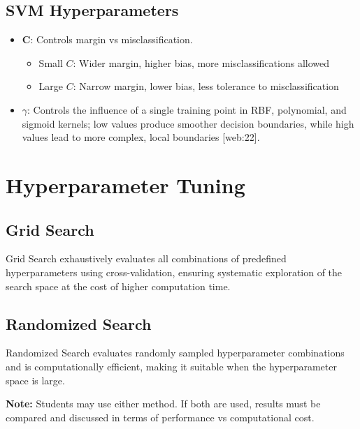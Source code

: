 \documentclass[11pt]{article}
\begin{document}
\subsection*{SVM Hyperparameters}
\begin{itemize}
\item \textbf{C}: Controls margin vs misclassification.
\begin{itemize}
\item Small $C$: Wider margin, higher bias, more misclassifications allowed
\item Large $C$: Narrow margin, lower bias, less tolerance to misclassification
\end{itemize}
\item \textbf{$\gamma$}: Controls the influence of a single training point in RBF, polynomial, and sigmoid kernels; low values produce smoother decision boundaries, while high values lead to more complex, local boundaries [web:22].
\end{itemize}

\section*{Hyperparameter Tuning}

\subsection*{Grid Search}
Grid Search exhaustively evaluates all combinations of predefined hyperparameters using cross-validation, ensuring systematic exploration of the search space at the cost of higher computation time.

\subsection*{Randomized Search}
Randomized Search evaluates randomly sampled hyperparameter combinations and is computationally efficient, making it suitable when the hyperparameter space is large.

\textbf{Note:} Students may use either method. If both are used, results must be compared and discussed in terms of performance vs computational cost.

\end{document}
